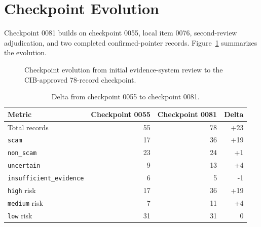 \documentclass[11pt]{article}
\begin{document}
\section{Checkpoint Evolution}

Checkpoint 0081 builds on checkpoint 0055, local item 0076, second-review adjudication, and two completed confirmed-pointer records.
Figure~\ref{fig:evolution} summarizes the evolution.

\begin{figure}[h]
\centering
{}
\caption{Checkpoint evolution from initial evidence-system review to the CIB-approved 78-record checkpoint.}
\label{fig:evolution}
\end{figure}

\begin{table}[h]
\centering
\caption{Delta from checkpoint 0055 to checkpoint 0081.}
\begin{tabularx}{0.92\textwidth}{@{}Yrrr@{}}
\toprule
Metric & Checkpoint 0055 & Checkpoint 0081 & Delta \\
\midrule
Total records & 55 & 78 & +23 \\
\texttt{scam} & 17 & 36 & +19 \\
\texttt{non\_scam} & 23 & 24 & +1 \\
\texttt{uncertain} & 9 & 13 & +4 \\
\texttt{insufficient\_evidence} & 6 & 5 & -1 \\
\texttt{high} risk & 17 & 36 & +19 \\
\texttt{medium} risk & 7 & 11 & +4 \\
\texttt{low} risk & 31 & 31 & 0 \\
\bottomrule
\end{tabularx}
\end{table}
\end{document}
